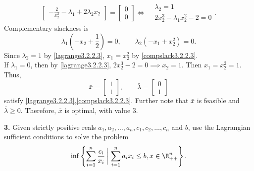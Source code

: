 \documentclass[../borwein-lewis_notes.tex]{subfiles}
\begin{document}
\begin{enumerate}[(a)]
{\begin{equation}
\begin{bmatrix}
-\frac{2}{x_2^2} - \lambda_1 + 2\lambda_2x_2
\end{bmatrix}
= \begin{bmatrix} 0 \\ 0\end{bmatrix}
\iff 
\begin{aligned}
&\lambda_2=1\\
& 2x_2^3 - \lambda_1x_2^2 - 2 = 0
\end{aligned}.
\label{lagrange3.2.2.3}
\end{equation}
Complementary slackness is 
\begin{equation}
\lambda_1\left(-x_2+\frac{1}{2}\right)=0,\qquad
 \lambda_2\left(-x_1+x_2^2
\right) = 0.
\label{compslack3.2.2.3}
\end{equation}
Since $\lambda_2=1$ by \eqref{lagrange3.2.2.3}, 
$x_1=x_2^2$ by \eqref{compslack3.2.2.3}.\\
If $\lambda_1=0$, then by \eqref{lagrange3.2.2.3}, 
$2x_2^3-2=0\implies x_2=1$. Then $x_1=x_2^2 = 1$. Thus, 
\begin{equation*}
\bar x = \begin{bmatrix}
1 \\ 1 
\end{bmatrix},
\qquad \bar\lambda  = \begin{bmatrix} 0 \\ 1\end{bmatrix}
\end{equation*}
satisfy \eqref{lagrange3.2.2.3},\eqref{compslack3.2.2.3}. 
Further note that $\bar x$ is feasible and $\bar\lambda\geq 0$. 
Therefore, $\bar x$ is optimal, with value $3$.
}
\end{enumerate}
\textbf{3.} Given strictly positive reals $a_1,a_2,\ldots, a_n, 
c_1,c_2,\ldots, c_n$ and $b$, use the Lagrangian sufficient conditions 
to solve the problem 
\begin{equation*}
\inf\left\{\sum_{i=1}^n \frac{c_i}{x_i}\,\bigg|\,\sum_{i=1}^n a_ix_i
\leq b, x\in\R_{++}^n\right\}.
\end{equation*}
\end{document}

